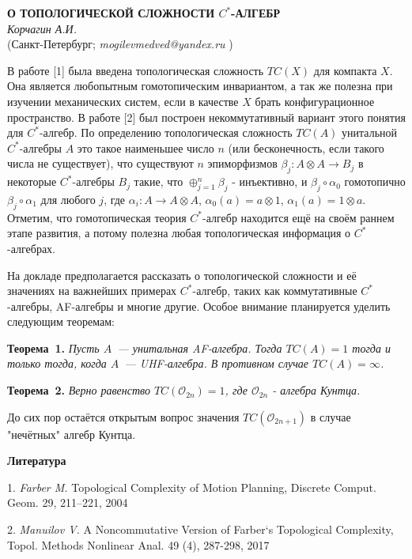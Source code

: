 \begin{center}{ \bf  О ТОПОЛОГИЧЕСКОЙ СЛОЖНОСТИ $C^*$-АЛГЕБР}\\
{\it Корчагин А.И. } \\
(Санкт-Петербург; {\it mogilevmedved@yandex.ru} )
\end{center}


В работе [1] была введена топологическая сложность $TC(X)$ для компакта $X$. Она является любопытным гомотопическим инвариантом, а так же полезна при изучении механических систем, если в качестве $X$ брать конфигурационное пространство. В работе [2] был построен некоммутативный вариант этого понятия для $C^*$-алгебр. По определению топологическая сложность $TC(A)$ унитальной $C^*$-алгебры $A$ это такое наименьшее число $n$ (или бесконечность, если такого числа не существует), что существуют $n$ эпиморфизмов $\beta_j:A\otimes A\to B_j$ в некоторые $C^*$-алгебры $B_j$ такие, что $\oplus_{j=1}^n\beta_j$ - инъективно, и $\beta_j\circ\alpha_0$ гомотопично $\beta_j\circ\alpha_1$ для любого $j$, где $\alpha_i:A\to A\otimes A$, $\alpha_0(a)=a\otimes1$, $\alpha_1(a)=1\otimes a$. Отметим, что гомотопическая теория $C^*$-алгебр находится ещё на своём раннем этапе развития, а потому полезна любая топологическая информация о $C^*$-алгебрах.

На докладе предполагается рассказать о топологической сло\-жности и её значениях на важнейших примерах $C^*$-алгебр, таких как коммутативные $C^*$-алгебры, AF-алгебры и многие другие. Особое внимание планируется уделить следующим теоремам:

\textbf{Теорема~1.} {\it Пусть $A$~--- унитальная AF-алгебра.
Тогда
\linebreak
${TC(A)=1}$ тогда и только тогда, когда $A$~--- UHF-алгебра. В противном случае $TC(A)=\infty$.}

\textbf{Теорема~2.} {\it Верно равенство $TC(\mathcal{O}_{2n})=1$, где $\mathcal{O}_{2n}$ - алгебра Кунтца.}

До сих пор остаётся открытым вопрос значения $TC(\mathcal{O}_{2n+1})$ в случае "нечётных" алгебр Кунтца.

\smallskip \centerline{\bf Литература}\nopagebreak

1. {\it Farber M.} Topological Complexity of Motion Planning, Dis\-c\-re\-te Comput. Geom. 29, 211–221, 2004

2. {\it Manuilov V.} A Noncommutative Version of Farber`s Topo\-lo\-gi\-cal Complexity, Topol. Methods Nonlinear
Anal. 49 (4), 287-298, 2017
